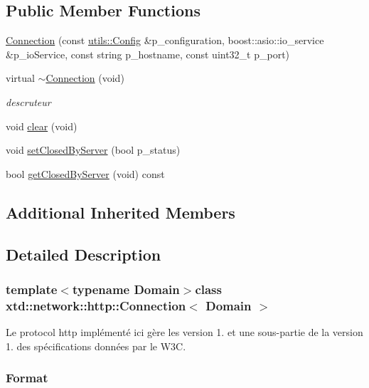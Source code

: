 \subsection*{Public Member Functions}
\begin{DoxyCompactItemize}
\item 
\hyperlink{classxtd_1_1network_1_1http_1_1Connection_ae327f3b673c40a8481aa7e39c1bc09a4}{Connection} (const \hyperlink{classxtd_1_1network_1_1utils_1_1Config}{utils\-::\-Config} \&p\-\_\-configuration, boost\-::asio\-::io\-\_\-service \&p\-\_\-io\-Service, const string p\-\_\-hostname, const uint32\-\_\-t p\-\_\-port)
\item 
virtual \hyperlink{classxtd_1_1network_1_1http_1_1Connection_a23b8ae18927be28e3c778b1a1b23eb60}{$\sim$\-Connection} (void)
\begin{DoxyCompactList}\small\item\em descruteur \end{DoxyCompactList}\item 
void \hyperlink{classxtd_1_1network_1_1http_1_1Connection_a6bc2b4d2ca1c399b2cce22e14b52d9c4}{clear} (void)
\item 
void \hyperlink{classxtd_1_1network_1_1http_1_1Connection_a7ba68b95f6a467599c0daa93960f5821}{set\-Closed\-By\-Server} (bool p\-\_\-status)
\item 
bool \hyperlink{classxtd_1_1network_1_1http_1_1Connection_abc2998698af66ef08e5750f43e45b00f}{get\-Closed\-By\-Server} (void) const 
\end{DoxyCompactItemize}
\subsection*{Additional Inherited Members}


\subsection{Detailed Description}
\subsubsection*{template$<$typename Domain$>$class xtd\-::network\-::http\-::\-Connection$<$ Domain $>$}

Le protocol http implémenté ici gère les version 1. et une sous-\/partie de la version 1. des spécifications données par le W3\-C. \subsubsection*{Format}

